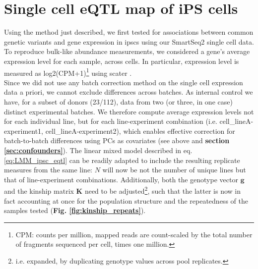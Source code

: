 
\section{Single cell eQTL map of iPS cells}
\label{sec:sc_ipsc_eqtl}

Using the method just described, we first tested for associations between common genetic variants and gene expression in \glspl{ipsc} using our SmartSeq2 single cell data.
To reproduce bulk-like abundance measurements, we considered a gene's average expression level for each sample, across cells.
In particular, expression level is measured as log2(CPM+1)\footnote{CPM: counts per million, mapped reads are count-scaled by the total number of fragments sequenced per cell, times one million.} using scater \cite{mccarthy2017scater}.
\\

Since we did not use any batch correction method on the single cell expression data a priori, we cannot exclude differences across batches.
As internal control we have, for a subset of donors (23/112), data from two (or three, in one case) distinct experimental batches.
We therefore compute average expression levels not for each individual line, but for each line-experiment combination (i.e. cell\_lineA-experiment1, cell\_lineA-experiment2), which enables effective correction for batch-to-batch differences using PCs as covariates (see above and \textbf{section
\ref{sec:confounders}}).
The linear mixed model described in eq. \eqref{eq:LMM_ipsc_eqtl} can be readily adapted to include the resulting replicate measures from the same line: $N$ will now be not the number of unique lines but that of line-experiment combinations.
Additionally, both the genotype vector $\mathbf{g}$ and the kinship matrix $\mathbf{K}$ need to be adjusted\footnote{i.e. expanded, by duplicating genotype values across pool replicates.}, such that the latter is now in fact accounting at once for the population structure and the repeatedness of the samples tested (\textbf{Fig. \ref{fig:kinship_repeats}}). \\

